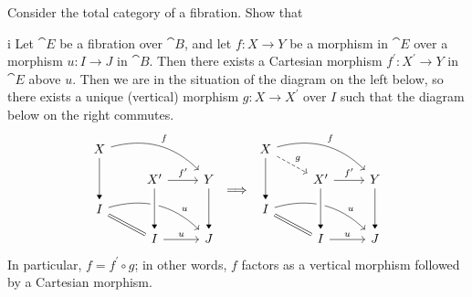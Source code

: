\begin{exercise}
Consider the total category of a fibration.
Show that
\end{exercise}

\begin{partsolution}{i}
Let \(\cat{E}\) be a fibration over \(\cat{B}\), and let \(f : X \to Y\) be a morphism in \(\cat{E}\) over a morphism \(u : I \to J\) in \(\cat{B}\).
Then there exists a Cartesian morphism \(f^\prime : X^\prime \to Y\) in \(\cat{E}\) above \(u\).
Then we are in the situation of the diagram on the left below, so there exists a unique (vertical) morphism \(g : X \to X^\prime\) over \(I\) such that the diagram below on the right commutes.
\begin{equation*}
\begin{tikzcd}[row sep=small]
X \arrow[rrd, bend left, "f"] \arrow[dd, -Triangle] \\
& X^\prime \arrow[r, "f^\prime"] & Y \arrow[dd, -Triangle] \\
I \arrow[rd, equal] \arrow[rrd, bend left, near end, "u"] \\
& I \arrow[r, "u"] & J
\arrow[from=uul, to=l, -Triangle, crossing over]
\end{tikzcd}
\implies
\begin{tikzcd}[row sep=small]
X \arrow[rrd, bend left, "f"] \arrow[dd, -Triangle] \arrow[rd, dashed, "g"] \\
& X^\prime \arrow[r, "f^\prime"] & Y \arrow[dd, -Triangle] \\
I \arrow[rd, equal] \arrow[rrd, bend left, near end, "u"] \\
& I \arrow[r, "u"] & J
\arrow[from=uul, to=l, -Triangle, crossing over]
\end{tikzcd}
\end{equation*}
In particular, \(f = f^\prime \circ g\); in other words, \(f\) factors as a vertical morphism followed by a Cartesian morphism.
\end{partsolution}

